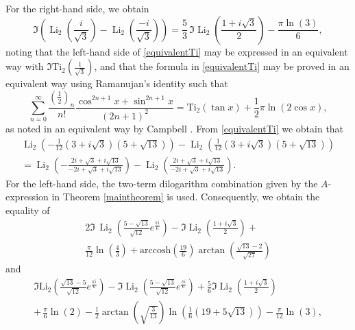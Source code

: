 \documentclass[12pt]{article}
\begin{document}
 For the right-hand side, we obtain 
\begin{equation}\label{equivalentTi}
 \Im \left(\operatorname{Li}_2\left(\frac{i}{\sqrt{3}}\right) 
 - \operatorname{Li}_2\left(\frac{-i}{\sqrt{3}}\right)\right)= \frac{5}{3} \, \Im\operatorname{Li}_2\left(\frac{1 + i\sqrt{3}}{2}\right) - \frac{\pi \ln(3)}{6}, 
\end{equation}
 noting that the left-hand side of \eqref{equivalentTi} may be expressed in an equivalent way with 
 $\Im \text{Ti}_{2}\left( \frac{1}{\sqrt{3}} \right)$, and that the formula in \eqref{equivalentTi} may be proved in an equivalent way using 
 Ramanujan's identity \cite{Ramanujan1915} such that $$ \sum_{n=0}^{\infty} \frac{ \left( \frac{1}{2} \right)_{n} }{n!} \frac{ \cos^{2n+1} x 
 + \sin^{2n+1} x }{(2n+1)^2} = \text{Ti}_{2}(\tan x) + \frac{1}{2} \pi \ln(2 \cos x), $$ as noted in an equivalent way by Campbell 
 \cite{Campbell2022}. From \eqref{equivalentTi} we obtain that 
\begin{equation*}
\begin{aligned}
 \operatorname{Li}_2\left(-\frac{1}{12} \left(3 + i\sqrt{3}\right)\left(5 + \sqrt{13}\right)\right) - \operatorname{Li}_2\left(\frac{1}{12}\left(3 + 
 i\sqrt{3}\right)\left(5 + \sqrt{13}\right)\right) \\ 
 = \operatorname{Li}_2\left(-\frac{2i + \sqrt{3} + i\sqrt{13}}{-2i + \sqrt{3} + i\sqrt{13}}\right) - \operatorname{Li}_2\left(\frac{2i + \sqrt{3} + 
 i\sqrt{13}}{-2i + \sqrt{3} + i\sqrt{13}}\right). 
\end{aligned}
\end{equation*}
 For the left-hand side, the two-term dilogarithm combination given by the $A$-expression in Theorem 
 \ref{maintheorem} is used. 
 Consequently, we obtain the equality of 
\begin{multline*} 
 2\Im \, \operatorname{Li}_2\left(\frac{5 - \sqrt{13}}{\sqrt{12}} e^{\frac{\pi i}{6}}\right) - \Im\operatorname{Li}_2\left(\frac{1 + i\sqrt{3}}{2}\right) + \\ 
 \frac{\pi}{12} \ln\left(\frac{4}{3}\right) + \text{arccosh}\left(\frac{19}{6}\right) \operatorname{arctan}\left(\frac{\sqrt{13} - 2}{\sqrt{27}}\right) 
\end{multline*} 
 and 
\begin{multline*} 
 \Im \text {Li}_2\left(\frac{ \sqrt{13}-5}{\sqrt{12}} e^{\frac{\pi i}{6}}\right) - 
 \Im \operatorname{Li}_2\left(\frac{5 - \sqrt{13}}{\sqrt{12}} e^{\frac{\pi i}{6}} 
 \right) + \frac{5}{6}\Im\operatorname{Li}_2\left(\frac{1 + i\sqrt{3}}{2}\right) \\ 
 + \, \frac{\pi}{6} \ln(2) - \frac{1}{2} \operatorname{arctan}\left(\sqrt{\frac{3}{13}}\right) \ln\left(\frac{1}{6}(19 + 5\sqrt{13})\right) 
 - \frac{\pi}{12} \ln(3), 
\end{multline*}
\end{document}
